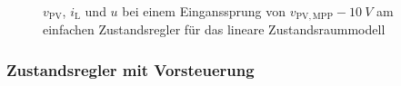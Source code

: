 \begin{figure}[H]
    \centering
    \caption[Validierung Regler mit einfacher Rückführung (linear)]{$v_{\mathrm{PV}}$, $i_{\mathrm{L}}$ und $u$ bei einem Einganssprung von $v_{\mathrm{PV,MPP}} - \SI{10}{V}$ am einfachen Zustandsregler für das lineare Zustandsraummodell}
    \label{fig:Bild14}
\end{figure}

\subsubsection{Zustandsregler mit Vorsteuerung}


